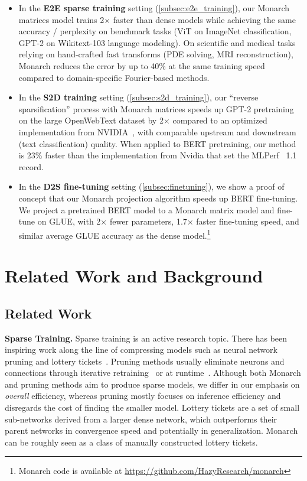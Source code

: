 \begin{itemize}[leftmargin=*,nosep,nolistsep,noitemsep]
\item In the \textbf{E2E sparse training} setting (\ref{subsec:e2e_training}), our Monarch matrices model trains 2$\times$ faster than dense models while achieving the same accuracy / perplexity on benchmark tasks (ViT on ImageNet classification, GPT-2 on Wikitext-103 language modeling). On scientific and medical tasks relying on hand-crafted fast transforms (PDE solving, MRI reconstruction), Monarch reduces the error by up to 40\% at the same training speed compared to domain-specific Fourier-based methods.
\item In the \textbf{S2D training} setting (\ref{subsec:s2d_training}), our ``reverse sparsification'' process with Monarch matrices speeds up GPT-2 pretraining on the large OpenWebText dataset by 2$\times$ compared to an optimized implementation from NVIDIA~\citep{shoeybi2019megatron}, with comparable upstream and downstream (text classification) quality. When applied to BERT pretraining, our method is 23\% faster than the implementation from Nvidia that set the MLPerf~\citep{mattson2020mlperf} 1.1 record.
\item In the \textbf{D2S fine-tuning} setting (\ref{subsec:finetuning}), we show a proof of concept that our Monarch projection algorithm speeds up BERT fine-tuning. We project a pretrained BERT model to a Monarch matrix model and fine-tune on GLUE, with 2$\times$ fewer parameters, 1.7$\times$ faster fine-tuning speed, and similar average GLUE accuracy as the dense model.\footnote{Monarch code is available at \url{https://github.com/HazyResearch/monarch}}
\end{itemize}

\section{Related Work and Background}
\label{sec:related_work}

\subsection{Related Work}

\textbf{Sparse Training.} Sparse training is an active research topic. There has been inspiring work along the line of compressing models such as neural network pruning and lottery tickets~\citep{han2015deep,han2015learning, frankle2018lottery}. Pruning methods usually eliminate neurons and connections through iterative retraining~\citep{han2015deep,han2015learning,sanh2020movement} or at runtime~\citep{NIPS2017_a51fb975,dong2017learning}. Although both Monarch and pruning methods aim to produce sparse models, we differ in our emphasis on \emph{overall} efficiency, whereas pruning mostly focuses on inference efficiency and disregards the cost of finding the smaller model. Lottery tickets \citep{frankle2018lottery,frankle2019stabilizing,frankle2020linear} are a set of small sub-networks derived from a larger dense network, which outperforms their parent networks in convergence speed and potentially in generalization. Monarch can be roughly seen as a class of manually constructed lottery tickets.

